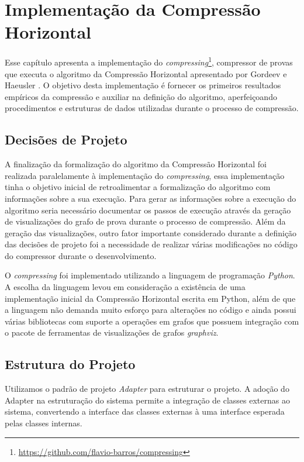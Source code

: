 
\chapter{Implementação da Compressão Horizontal}
\label{cap:impl_exp}

Esse capítulo apresenta a implementação do \textit{compressing}\footnote{\href{https://github.com/flavio-barros/compressing}{https://github.com/flavio-barros/compressing}}, compressor de provas que executa o algoritmo da Compressão Horizontal apresentado por Gordeev e Haeusler \cite{GordeevH16}. O objetivo desta implementação é fornecer os primeiros resultados empíricos da compressão e auxiliar na definição do algoritmo, aperfeiçoando procedimentos e estruturas de dados utilizadas durante o processo de compressão.

\section{Decisões de Projeto}

A finalização da formalização do algoritmo da Compressão Horizontal foi realizada paralelamente à implementação do \textit{compressing}, essa implementação tinha o objetivo inicial de retroalimentar a formalização do algoritmo com informações sobre a sua execução. Para gerar as informações sobre a execução do algoritmo seria necessário documentar os passos de execução através da geração de visualizações do grafo de prova durante o processo de compressão. Além da geração das visualizações, outro fator importante considerado durante a definição das decisões de projeto foi a necessidade de realizar várias modificações no código do compressor durante o desenvolvimento.

O \textit{compressing} foi implementado utilizando a linguagem de programação \textit{Python}. A escolha da linguagem levou em consideração a existência de uma implementação inicial da Compressão Horizontal escrita em Python, além de que a linguagem não demanda muito esforço para alterações no código e ainda possui várias bibliotecas com suporte a operações em grafos que possuem integração com o pacote de ferramentas de visualizações de grafos \textit{graphviz}.

\section{Estrutura do Projeto}

Utilizamos o padrão de projeto \textit{Adapter} para estruturar o projeto. A adoção do Adapter na estruturação do sistema permite a integração de classes externas ao sistema, convertendo a interface das classes externas à uma interface esperada pelas classes internas. 

